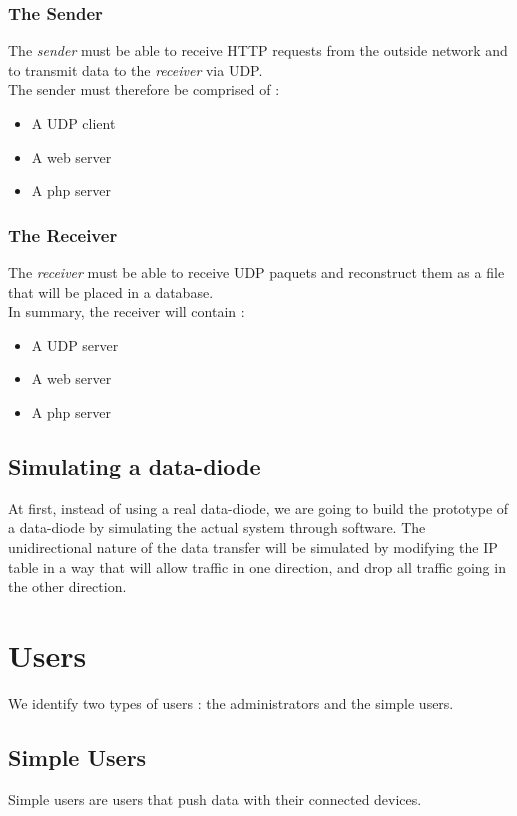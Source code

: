 \documentclass[a4paper,11pt]{article}
\begin{document}
\subsubsection{The Sender}
The \textit{sender} must be able to receive HTTP requests from the outside network and to transmit data to the \textit{receiver} via UDP.\\

The sender must therefore be comprised of :
\begin{itemize}
\item{A UDP client}
\item{A web server}
\item{A php server}
\end{itemize} 

\subsubsection{The Receiver}
The \textit{receiver} must be able to receive UDP paquets and reconstruct them as a file that will be placed in a database. \\

In summary, the receiver will contain :
\begin{itemize}
\item{A UDP server}
\item{A web server}
\item{A php server}
\end{itemize}

\subsection{Simulating a data-diode}
At first, instead of using a real data-diode, we are going to build the prototype of a data-diode by simulating the actual system through software. The unidirectional nature of the data transfer will be simulated by modifying the IP table in a way that will allow traffic in one direction, and drop all traffic going in the other direction.


\section{Users}
We identify two types of users : the administrators and the simple users.

\subsection{Simple Users}
Simple users are users that push data with their connected devices.
\end{document}
